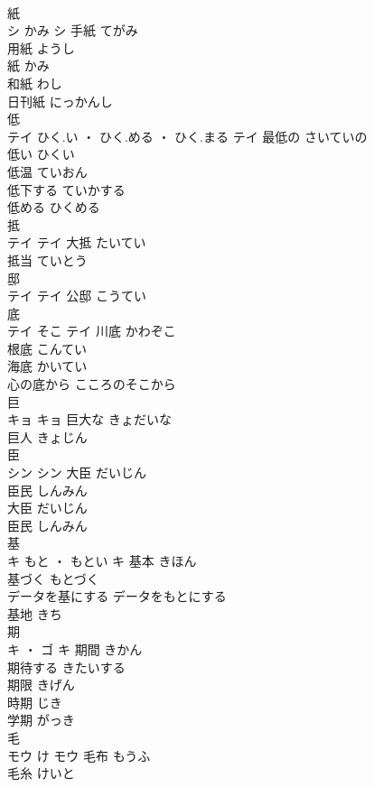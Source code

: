 \documentclass[8pt]{extreport}
\begin{document}
\begin{CJK}{UTF8}{min}
\\	紙	
\\	シ	かみ	シ	手紙	てがみ	
\\	用紙	ようし	
\\	紙	かみ	
\\	和紙	わし	
\\	日刊紙	にっかんし	
\\	低	
\\	テイ	ひく.い ・ ひく.める ・ ひく.まる	テイ	最低の	さいていの	
\\	低い	ひくい	
\\	低温	ていおん	
\\	低下する	ていかする	
\\	低める	ひくめる	
\\	抵	
\\	テイ		テイ	大抵	たいてい	
\\	抵当	ていとう	
\\	邸	
\\	テイ		テイ													公邸	こうてい	
\\	底	
\\	テイ	そこ	テイ	川底	かわぞこ	
\\	根底	こんてい	
\\	海底	かいてい	
\\	心の底から	こころのそこから	
\\	巨	
\\	キョ		キョ	巨大な	きょだいな	
\\	巨人	きょじん	
\\	臣	
\\	シン		シン	大臣	だいじん	
\\	臣民	しんみん	
\\	大臣	だいじん	
\\	臣民	しんみん	
\\	基	
\\	キ	もと ・ もとい	キ	基本	きほん	
\\	基づく	もとづく	
\\	データを基にする	データをもとにする	
\\	基地	きち	
\\	期	
\\	キ ・ ゴ		キ	期間	きかん	
\\	期待する	きたいする	
\\	期限	きげん	
\\	時期	じき	
\\	学期	がっき	
\\	毛	
\\	モウ	け	モウ	毛布	もうふ	
\\	毛糸	けいと	

\end{CJK}
\end{document}
